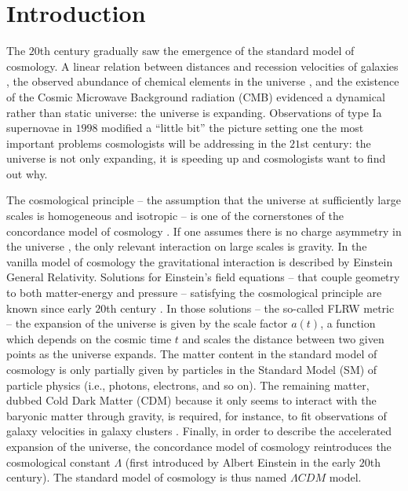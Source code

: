 \chapter*{Introduction}
\label{intro} 

The $20$th century gradually saw the emergence of the standard model of cosmology. A linear relation between distances and recession velocities of galaxies \cite{Hubble:1929ig}, the observed abundance of chemical elements in the universe \cite{Gamow:1946eb,Alpher:1948ve,Gamow:1949zz,Alpher:1950zz}, and the existence of the Cosmic Microwave Background radiation (CMB) \cite{Alpher:1950zz,Penzias:1965wn} evidenced a dynamical rather than static universe: the universe is expanding. Observations of type Ia supernovae in $1998$ \cite{Riess:1998cb,Perlmutter:1998np} modified a ``little bit'' the picture setting one the most important problems cosmologists will be addressing in the $21$st century: the universe is not only expanding, it is speeding up and cosmologists want to find out why. 

The cosmological principle -- the assumption that the universe at sufficiently large scales is homogeneous and isotropic -- is one of the cornerstones of the concordance model of cosmology \cite{Robertson:1935zz,Walker1937}. If one assumes there is no charge asymmetry in the universe \cite{Caprini:2003gz}, the only relevant interaction on large scales is gravity. In the vanilla model of cosmology the gravitational interaction is described by Einstein General Relativity. Solutions for Einstein's field equations -- that couple geometry to both matter-energy and pressure -- satisfying the cosmological principle are known since early $20$th century \cite{Friedman:1922kd,Friedmann:1924bb,Lemaitre:1927zz,Lemaitre:1931zz}. In those solutions -- the so-called FLRW metric -- the expansion of the universe is given by the scale factor $a(t)$, a function which depends on the cosmic time $t$ and scales the distance between two given points as the universe expands. The matter content in the standard model of cosmology is only partially given by particles in the Standard Model (SM) of particle physics (i.e., photons, electrons, and so on). The remaining matter, dubbed Cold Dark Matter (CDM) because it only seems to interact with the baryonic matter through gravity, is required, for instance, to fit observations of galaxy velocities in galaxy clusters \cite{Zwicky:1933gu}. Finally, in order to describe the accelerated expansion of the universe, the concordance model of cosmology reintroduces the cosmological constant $\Lambda$ (first introduced by Albert Einstein in the early $20$th century). The standard model of cosmology is thus named  $\Lambda CDM$ model.

